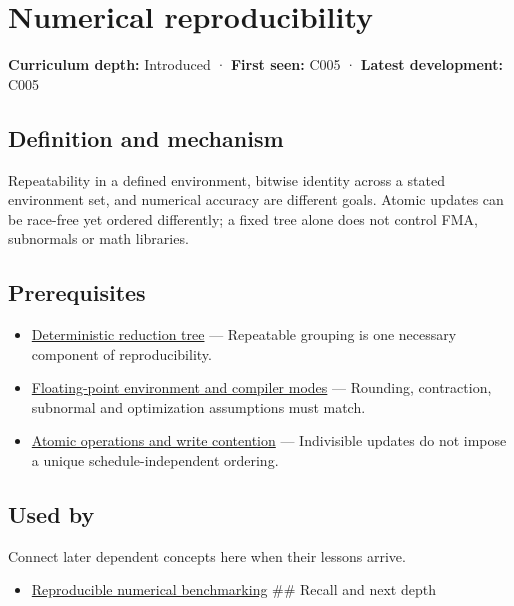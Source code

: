 \hypertarget{appendix-5f1a2c3f97ff}{}\label{referencestart:appendix-5f1a2c3f97ff}
\section{Numerical reproducibility}\label{appendix-5f1a2c3f97ff-numerical-reproducibility}

\textbf{Curriculum depth:} Introduced · \textbf{First seen:} C005 · \textbf{Latest development:} C005

\subsection{Definition and mechanism}\label{appendix-5f1a2c3f97ff-definition-and-mechanism}

Repeatability in a defined environment, bitwise identity across a stated environment set, and numerical accuracy are different goals. Atomic updates can be race-free yet ordered differently; a fixed tree alone does not control FMA, subnormals or math libraries.

\subsection{Prerequisites}\label{appendix-5f1a2c3f97ff-prerequisites}

\begin{itemize}
\tightlist
\item
  \hyperref[appendix-4c8e0238e7ee]{Deterministic reduction tree} --- Repeatable grouping is one necessary component of reproducibility.
\item
  \hyperref[appendix-f11d1a521253]{Floating-point environment and compiler modes} --- Rounding, contraction, subnormal and optimization assumptions must match.
\item
  \hyperref[appendix-e12d1b03fefb]{Atomic operations and write contention} --- Indivisible updates do not impose a unique schedule-independent ordering.
\end{itemize}

\subsection{Used by}\label{appendix-5f1a2c3f97ff-used-by}

Connect later dependent concepts here when their lessons arrive.

\begin{itemize}
\tightlist
\item
  \hyperref[appendix-b9db93e28371]{Reproducible numerical benchmarking} \#\# Recall and next depth
\end{itemize}

